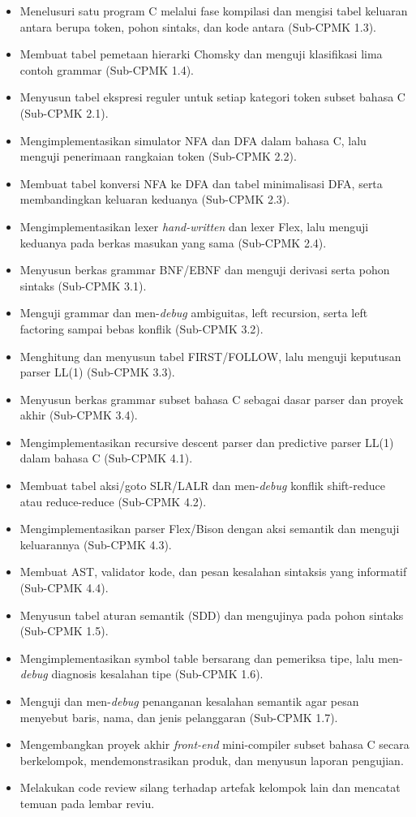 \documentclass[12pt,a4paper]{article}
\begin{document}
\begin{itemize}[leftmargin=*]
  \item Menelusuri satu program C melalui fase kompilasi dan mengisi tabel keluaran antara berupa token, pohon sintaks, dan kode antara (Sub-CPMK 1.3).
  \item Membuat tabel pemetaan hierarki Chomsky dan menguji klasifikasi lima contoh grammar (Sub-CPMK 1.4).
  \item Menyusun tabel ekspresi reguler untuk setiap kategori token subset bahasa C (Sub-CPMK 2.1).
  \item Mengimplementasikan simulator NFA dan DFA dalam bahasa C, lalu menguji penerimaan rangkaian token (Sub-CPMK 2.2).
  \item Membuat tabel konversi NFA ke DFA dan tabel minimalisasi DFA, serta membandingkan keluaran keduanya (Sub-CPMK 2.3).
  \item Mengimplementasikan lexer \textit{hand-written} dan lexer Flex, lalu menguji keduanya pada berkas masukan yang sama (Sub-CPMK 2.4).
  \item Menyusun berkas grammar BNF/EBNF dan menguji derivasi serta pohon sintaks (Sub-CPMK 3.1).
  \item Menguji grammar dan men-\textit{debug} ambiguitas, left recursion, serta left factoring sampai bebas konflik (Sub-CPMK 3.2).
  \item Menghitung dan menyusun tabel FIRST/FOLLOW, lalu menguji keputusan parser LL(1) (Sub-CPMK 3.3).
  \item Menyusun berkas grammar subset bahasa C sebagai dasar parser dan proyek akhir (Sub-CPMK 3.4).
  \item Mengimplementasikan recursive descent parser dan predictive parser LL(1) dalam bahasa C (Sub-CPMK 4.1).
  \item Membuat tabel aksi/goto SLR/LALR dan men-\textit{debug} konflik shift-reduce atau reduce-reduce (Sub-CPMK 4.2).
  \item Mengimplementasikan parser Flex/Bison dengan aksi semantik dan menguji keluarannya (Sub-CPMK 4.3).
  \item Membuat AST, validator kode, dan pesan kesalahan sintaksis yang informatif (Sub-CPMK 4.4).
  \item Menyusun tabel aturan semantik (SDD) dan mengujinya pada pohon sintaks (Sub-CPMK 1.5).
  \item Mengimplementasikan symbol table bersarang dan pemeriksa tipe, lalu men-\textit{debug} diagnosis kesalahan tipe (Sub-CPMK 1.6).
  \item Menguji dan men-\textit{debug} penanganan kesalahan semantik agar pesan menyebut baris, nama, dan jenis pelanggaran (Sub-CPMK 1.7).
  \item Mengembangkan proyek akhir \textit{front-end} mini-compiler subset bahasa C secara berkelompok, mendemonstrasikan produk, dan menyusun laporan pengujian.
  \item Melakukan code review silang terhadap artefak kelompok lain dan mencatat temuan pada lembar reviu.
\end{itemize}
\end{document}
